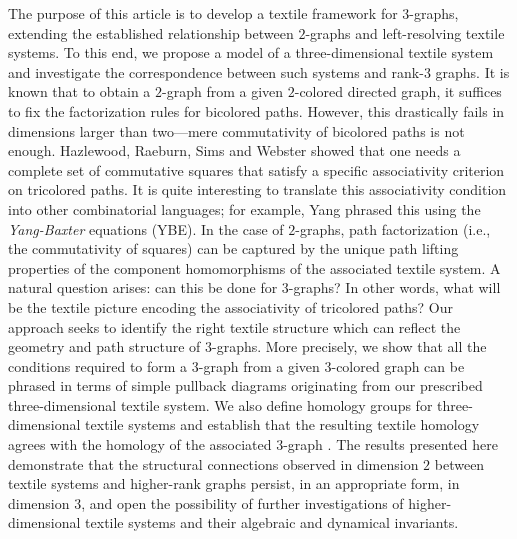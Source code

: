 \documentclass[a4paper,reqno,12pt]{amsart}
\theoremstyle{definition}
\theoremstyle{remark}
\begin{document}
The purpose of this article is to develop a textile framework for $3$-graphs, extending the established relationship between $2$-graphs and left-resolving textile systems. To this end, we propose a model of a three-dimensional textile system and investigate the correspondence between such systems and rank-$3$ graphs. It is known that to obtain a $2$-graph from a given $2$-colored directed graph, it suffices to fix the factorization rules for bicolored paths. However, this drastically fails in dimensions larger than two---mere commutativity of bicolored paths is not enough. Hazlewood, Raeburn, Sims and Webster \cite{HRSW} showed that one needs a complete set of commutative squares that satisfy a specific associativity criterion on tricolored paths. It is quite interesting to translate this associativity condition into other combinatorial languages; for example, Yang \cite{Yang} phrased this using the \emph{Yang-Baxter} equations (YBE). In the case of $2$-graphs, path factorization (i.e., the commutativity of squares) can be captured by the unique path lifting properties of the component homomorphisms of the associated textile system. A natural question arises: can this be done for $3$-graphs? In other words, what will be the textile picture encoding the associativity of tricolored paths? Our approach seeks to identify the right textile structure which can reflect the geometry and path structure of $3$-graphs. More precisely, we show that all the conditions required to form a $3$-graph from a given $3$-colored graph can be phrased in terms of simple pullback diagrams originating from our prescribed three-dimensional textile system. We also define homology groups for three-dimensional textile systems and establish that the resulting textile homology agrees with the homology of the associated $3$-graph \cite{HomKPS}. The results presented here demonstrate that the structural connections observed in dimension $2$ between textile systems and higher-rank graphs persist, in an appropriate form, in dimension $3$, and open the possibility of further investigations of higher-dimensional textile systems and their algebraic and dynamical invariants.
\end{document}
